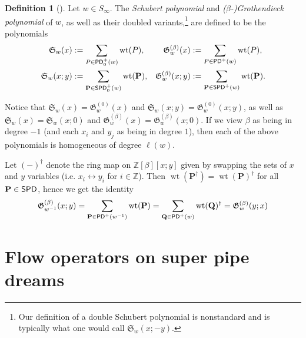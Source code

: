 \documentclass[11pt,reqno]{amsart} %
\newcommand{\bbZ}{\mathbb{Z}}
\newcommand{\frakS}{\mathfrak{S}}
\newcommand{\frakG}{\mathfrak{G}}
\newcommand{\bfP}{\mathbf{P}}
\newcommand{\bfQ}{\mathbf{Q}}
\DeclareMathOperator{\wt}{wt}
\DeclareMathOperator{\PD}{\sf{PD}}
\DeclareMathOperator{\SPD}{\sf{SPD}}
\theoremstyle{definition}
\newtheorem{definition}[theorem]{Definition}
\begin{document}
\begin{definition}[\cite{BergeronBilley93,FominKirillov96,FominKirillov94}]
Let $w\in S_\infty$.
The
\textit{Schubert polynomial} and
\textit{($\beta$-)Grothendieck polynomial} of $w$,
as well as their doubled variants,\footnote{
    Our definition of a double Schubert polynomial is nonstandard and is typically what one would call $\frakS_w(x;-y)$.
}
are defined to be the polynomials
\begin{align*}
    \frakS_w(x)
    &:= \sum_{P\in \PD^+_0(w)} \wt(P),
    &
    \frakG_w^{(\beta)}(x)
    &:= \sum_{P\in \PD^+(w)} \wt(P),
    \\
    \frakS_w(x;y)
    &:= \sum_{\bfP\in \SPD_0^+(w)} \wt(\bfP),
    &
    \frakG_w^{(\beta)}(x;y)
    &:= \sum_{\bfP\in \SPD^+(w)} \wt(\bfP).
\end{align*}
\end{definition}

Notice that $\frakS_w(x) = \frakG_w^{(0)}(x)$ and $\frakS_w(x;y) = \frakG_w^{(0)}(x;y)$, as well as $\frakS_w(x) = \frakS_w(x;0)$ and $\frakG_w^{(\beta)}(x) = \frakG_w^{(\beta)}(x;0)$.
If we view $\beta$ as being in degree $-1$ (and each $x_i$ and $y_j$ as being in degree $1$), then each of the above polynomials is homogeneous of degree $\ell(w)$.

Let $(-)^\dagger$ denote the ring map on $\bbZ[\beta][x;y]$ given by swapping the sets of $x$ and $y$ variables (i.e. $x_i\leftrightarrow y_i$ for $i\in\bbZ$).
Then $\wt(\bfP^\dagger) = \wt(\bfP)^\dagger$ for all $\bfP\in \SPD$, hence we get the identity \[
    \frakG_{w^{-1}}^{(\beta)}(x;y)
    = \sum_{\bfP\in \PD^+(w^{-1})} \wt(\bfP)
    = \sum_{\bfQ\in \PD^+(w)} \wt(\bfQ)^\dagger
    = \frakG_w^{(\beta)}(y;x)
\]

\section{Flow operators on super pipe dreams}
\label{sect:flow ops}
\end{document}
